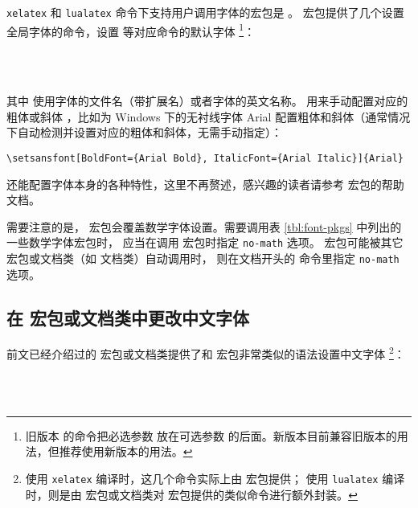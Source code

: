 \texttt{xelatex} 和 \texttt{lualatex} 命令下支持用户调用字体的宏包是 。
宏包提供了几个设置全局字体的命令，设置  等对应命令的默认字体%
\footnote{旧版本  的命令把必选参数  放在可选参数  的后面。新版本目前兼容旧版本的用法，但推荐使用新版本的用法。}：
\begin{command}
 \\
 \\
\end{command}
其中  使用字体的文件名（带扩展名）或者字体的英文名称。 用来手动配置对应的粗体或斜体
，比如为 Windows 下的无衬线字体 Arial 配置粗体和斜体（通常情况下自动检测并设置对应的粗体和斜体，无需手动指定）：
\begin{verbatim}
\setsansfont[BoldFont={Arial Bold}, ItalicFont={Arial Italic}]{Arial}
\end{verbatim}
 还能配置字体本身的各种特性，这里不再赘述，感兴趣的读者请参考  宏包的帮助文档。

需要注意的是， 宏包会覆盖数学字体设置。需要调用表 \ref{tbl:font-pkgs} 中列出的一些数学字体宏包时，
应当在调用  宏包时指定 \texttt{no-math} 选项。 宏包可能被其它宏包或文档类（如  文档类）自动调用时，
则在文档开头的  命令里指定 \texttt{no-math} 选项。

\subsection{在  宏包或文档类中更改中文字体}\label{subsec:CJKfont}

前文已经介绍过的  宏包或文档类提供了和  宏包非常类似的语法设置中文字体%
\footnote{使用 \texttt{xelatex} 编译时，这几个命令实际上由  宏包提供；
使用 \texttt{lualatex} 编译时，则是由  宏包或文档类对  宏包提供的类似命令进行额外封装。}：
\begin{command}
 \\
 \\
\end{command}


